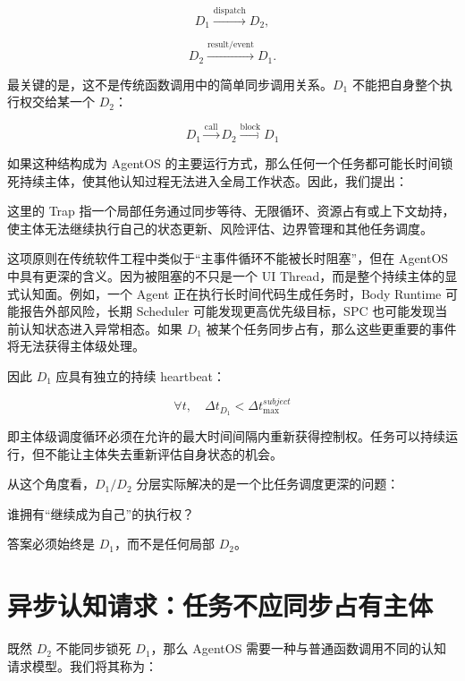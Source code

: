 \[
D_1
\xrightarrow{\mathrm{dispatch}}
D_2,
\]

\[
D_2
\xrightarrow{\mathrm{result/event}}
D_1.
\]

最关键的是，这不是传统函数调用中的简单同步调用关系。$D_1$ 不能把自身整个执行权交给某一个 $D_2$：

\[
D_1
\xrightarrow{\mathrm{call}}
D_2
\xrightarrow{\mathrm{block}}
D_1
\]

如果这种结构成为 AgentOS 的主要运行方式，那么任何一个任务都可能长时间锁死持续主体，使其他认知过程无法进入全局工作状态。因此，我们提出：

\begin{statementbox}
\centering
{}
\end{statementbox}

这里的 Trap 指一个局部任务通过同步等待、无限循环、资源占有或上下文劫持，使主体无法继续执行自己的状态更新、风险评估、边界管理和其他任务调度。

这项原则在传统软件工程中类似于“主事件循环不能被长时阻塞”，但在 AgentOS 中具有更深的含义。因为被阻塞的不只是一个 UI Thread，而是整个持续主体的显式认知面。例如，一个 Agent 正在执行长时间代码生成任务时，Body Runtime 可能报告外部风险，长期 Scheduler 可能发现更高优先级目标，SPC 也可能发现当前认知状态进入异常相态。如果 $D_1$ 被某个任务同步占有，那么这些更重要的事件将无法获得主体级处理。

因此 $D_1$ 应具有独立的持续 heartbeat：

\[
\boxed{
\forall t,\quad
\Delta t_{D_1}
<
\Delta t_{\max}^{subject}
}
\]

即主体级调度循环必须在允许的最大时间间隔内重新获得控制权。任务可以持续运行，但不能让主体失去重新评估自身状态的机会。

从这个角度看，$D_1/D_2$ 分层实际解决的是一个比任务调度更深的问题：

\begin{statementbox}
谁拥有“继续成为自己”的执行权？
\end{statementbox}

答案必须始终是 $D_1$，而不是任何局部 $D_2$。

\section{异步认知请求：任务不应同步占有主体}

既然 $D_2$ 不能同步锁死 $D_1$，那么 AgentOS 需要一种与普通函数调用不同的认知请求模型。我们将其称为：

